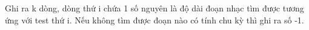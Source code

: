 Ghi ra k dòng, dòng thứ i chứa 1 số nguyên là độ dài đoạn nhạc tìm được tương ứng với test thứ i. Nếu không tìm được đoạn nào có tính chu kỳ thì ghi ra số -1.

\